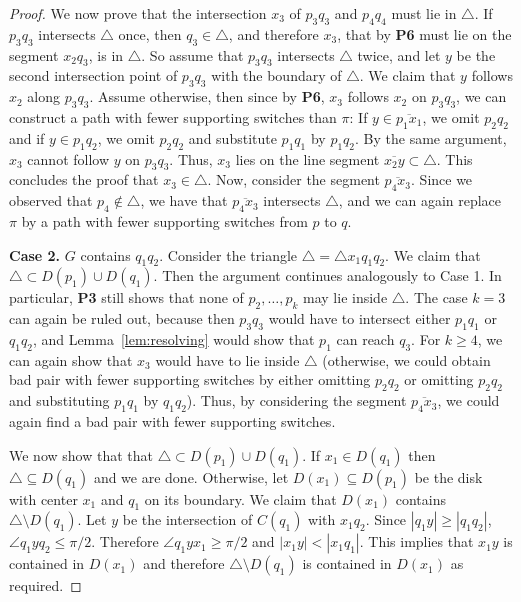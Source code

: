 \documentclass[11pt,a4paper]{paper}
\begin{document}
\begin{proof}
We now prove that the intersection $x_3$ of
$p_3q_3$ and $p_4q_4$ must
lie in $\triangle$.
If
 $p_3q_3$ intersects $\triangle$
once, then $q_3 \in \triangle$,
and therefore $x_3$, that by \textbf{P6} must lie on the segment
$x_2q_3$, is in $\triangle$. So assume that
$p_3q_3$ intersects
$\triangle$ twice, and let $y$ be the second intersection
point of $p_3q_3$ with the boundary of $\triangle$. We claim that $y$ follows $x_2$
along $p_3q_3$. Assume otherwise, then since by \textbf{P6}, $x_3$  follows
 $x_2$ on $p_3q_3$,
we can construct a path with fewer supporting switches than $\pi$:
If $y \in \overline{p_1x_1}$, we omit
$p_2q_2$ and
if $y \in p_1q_2$,
we omit $p_2q_2$
and substitute $p_1q_1$ by $p_1q_2$.
By the same argument, $x_3$ cannot follow $y$ on
$p_3q_3$.
Thus, $x_3$ lies on
the line segment $\overline{x_2y} \subset \triangle$.
This concludes the proof that
 $x_3 \in \triangle$.
Now, consider the segment $\overline{p_4x_3}$. Since we observed that
$p_4 \not\in\triangle$, we have that $\overline{p_4x_3}$
intersects $\triangle$, and we can again replace $\pi$ by a path with fewer supporting 
switches from $p$ to $q$.

\textbf{Case 2.} $G$ contains $q_1q_2$.
Consider the triangle
$\triangle = \triangle x_1q_1q_2$. We claim
that $\triangle \subset D(p_1) \cup D(q_1)$.
Then the  argument continues analogously  to
Case 1. In particular, 
\textbf{P3} still shows that none of $p_2,\dots,p_k$
may lie inside $\triangle$. The case $k = 3$ 
can again be ruled out, because then $p_3q_3$ would have to
intersect either $p_1q_1$ or $q_1q_2$, and 
Lemma~\ref{lem:resolving} would show that $p_1$ can reach $q_3$.
For $k \geq 4$, we can again show that 
$x_3$ would have to lie inside $\triangle$ (otherwise,
we could obtain bad pair with fewer supporting switches
by either omitting $p_2q_2$ or omitting $p_2q_2$ and 
substituting $p_1q_1$ by $q_1q_2$). Thus, by considering
the segment $\overline{p_4x_3}$, we could again find 
a bad pair with fewer supporting switches.

We now show that
that $\triangle \subset D(p_1) \cup D(q_1)$.
If $x_1 \in D(q_1)$ then $\triangle \subseteq D(q_1)$ and we are done.
Otherwise,
let $D(x_1) \subseteq D(p_1)$ be the disk with center $x_1$ and $q_1$
on its boundary. We claim that $D(x_1)$ contains $\triangle\setminus D(q_1)$.
Let $y$ be the intersection of $C(q_1)$ with $x_1q_2$.
Since $|q_1y| \ge  |q_1q_2|$, $\angle q_1yq_2 \le \pi/2$. Therefore
$\angle q_1yx_1 \ge \pi/2$ and
$|x_1y| < |x_1q_1|$.
This implies that $x_1y$ is contained in $D(x_1)$ and therefore
$\triangle\setminus D(q_1)$ is contained in $D(x_1)$ as required.
\end{proof}
\end{document}
